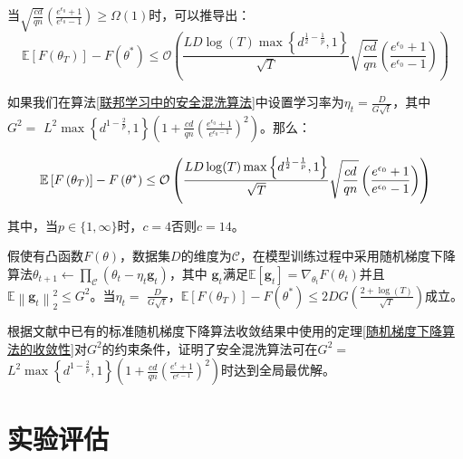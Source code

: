 当$\sqrt{\frac{c d}{q n}}\left(\frac{e^{\epsilon_{0}}+1}{e^{\epsilon_{0}}-1}\right) \geq \Omega(1)$时，可以推导出：
\begin{equation}\label{eq:模型收敛性证明3}
\mathbb{E}\left[F\left(\theta_{T}\right)\right]-F\left(\theta^{*}\right) \leq \mathcal{O}\left(\frac{L D \log (T) \max \left\{d^{\frac{1}{2}-\frac{1}{p}}, 1\right\}}{\sqrt{T}} \sqrt{\frac{c d}{q n}}\left(\frac{e^{\epsilon_{0}}+1}{e^{\epsilon_{0}}-1}\right)\right)
\end{equation}

如果我们在算法\ref{联邦学习中的安全混洗算法}中设置学习率为$\eta_{t}=\frac{D}{G \sqrt{t}}$，其中\\$G^{2}=$ $L^{2} \max \left\{d^{1-\frac{2}{p}}, 1\right\}\left(1+\frac{c d}{q n}\left(\frac{e^{\epsilon_{0}}+1}{e^{\epsilon_{0}-1}}\right)^{2}\right)$。那么：

\begin{equation}\label{eq:模型收敛性证明4}
\mathbb{E}\left[F\left(\theta_{T}\right)\right]-F\left(\theta^{*}\right) \leq \\
\mathcal{O}\left(\frac{L D \log (T) \max \left\{d^{\frac{1}{2}-\frac{1}{p}}, 1\right\}}{\sqrt{T}} \sqrt{\frac{c d}{q n}}\left(\frac{e^{\epsilon_{0}}+1}{e^{\epsilon_{0}}-1}\right)\right)
\end{equation}

其中，当$p \in\{1, \infty\}$时，$c=4$否则$c=14$。

\begin{theorem}[随机梯度下降算法的收敛性]\label{随机梯度下降算法的收敛性}
假使有凸函数$F(\theta)$，数据集$D$的维度为$\mathcal{C}$，在模型训练过程中采用随机梯度下降算法$\theta_{t+1} \leftarrow \prod_{\mathcal{C}}\left(\theta_{t}-\eta_{t} \mathbf{g}_{t}\right)$，其中 $\mathbf{g}_{t}$满足$\mathbb{E}\left[\mathbf{g}_{t}\right]=\nabla_{\theta_{t}} F\left(\theta_{t}\right)$并且$\mathbb{E}\left\|\mathbf{g}_{t}\right\|_{2}^{2} \leq G^{2}$。当$\eta_{t}=$ $\frac{D}{G \sqrt{t}}$，$\mathbb{E}\left[F\left(\theta_{T}\right)\right]-F\left(\theta^{*}\right) \leq 2 D G\left(\frac{2+\log (T)}{\sqrt{T}}\right)$成立。
\end{theorem}

根据文献中已有的标准随机梯度下降算法收敛结果中使用的定理\ref{随机梯度下降算法的收敛性}对$G^{2}$的约束条件，证明了安全混洗算法可在$G^{2}=$ $L^{2} \max \left\{d^{1-\frac{2}{p}}, 1\right\}\left(1+\frac{c d}{q n}\left(\frac{e^{\epsilon}+1}{e^{\epsilon-1}}\right)^{2}\right)$时达到全局最优解。

\section{实验评估}
